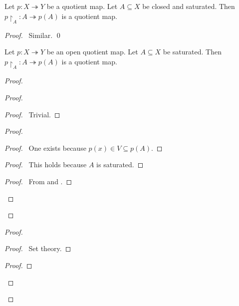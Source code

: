 \begin{prop}
  Let $p : X \twoheadrightarrow Y$ be a quotient map. Let $A \subseteq X$ be
  closed and saturated. Then $p \restriction_A : A \twoheadrightarrow p(A)$
  is
  a
  quotient map.
\end{prop}

\begin{proof}
  \pf\ Similar. \qed
\end{proof}

\begin{prop}
  Let $p : X \twoheadrightarrow Y$ be an open quotient map. Let $A \subseteq
  X$ be
  saturated. Then $p \restriction_A : A \twoheadrightarrow p(A)$ is a
  quotient map.
\end{prop}

\begin{proof}
  \pf
  \begin{proof}
    \begin{proof}
      \pf\ Trivial.
    \end{proof}
    \begin{proof}
      \begin{proof}
        \pf\ One exists because $p(x) \in V \subseteq p(A)$.
      \end{proof}
      \begin{proof}
        \pf\ This holds because $A$ is saturated.
      \end{proof}
      \begin{proof}
        \pf\ From  and .
      \end{proof}
    \end{proof}
  \end{proof}
  \begin{proof}
    \begin{proof}
      \pf\ Set theory.
    \end{proof}
    \begin{proof}

\end{proof}
\end{proof}
\end{proof}
